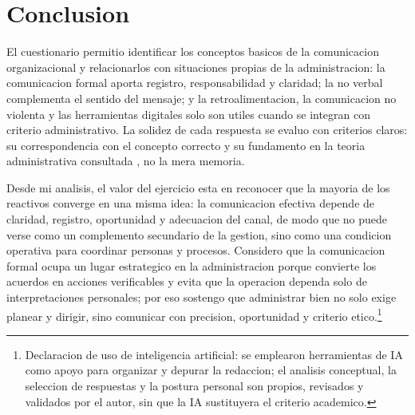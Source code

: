 \documentclass[
	spanish,
	letterpaper, oneside
]{article}
\begin{document}
\clearpage
\section{Conclusion}

El cuestionario permitio identificar los conceptos basicos de la comunicacion organizacional y relacionarlos con situaciones propias de la administracion: la comunicacion formal aporta registro, responsabilidad y claridad; la no verbal complementa el sentido del mensaje; y la retroalimentacion, la comunicacion no violenta y las herramientas digitales solo son utiles cuando se integran con criterio administrativo. La solidez de cada respuesta se evaluo con criterios claros: su correspondencia con el concepto correcto y su fundamento en la teoria administrativa consultada \citep{robbins2017administracion,chiavenato2019introduccion}, no la mera memoria.

Desde mi analisis, el valor del ejercicio esta en reconocer que la mayoria de los reactivos converge en una misma idea: la comunicacion efectiva depende de claridad, registro, oportunidad y adecuacion del canal, de modo que no puede verse como un complemento secundario de la gestion, sino como una condicion operativa para coordinar personas y procesos. Considero que la comunicacion formal ocupa un lugar estrategico en la administracion porque convierte los acuerdos en acciones verificables y evita que la operacion dependa solo de interpretaciones personales; por eso sostengo que administrar bien no solo exige planear y dirigir, sino comunicar con precision, oportunidad y criterio etico.\footnote{Declaracion de uso de inteligencia artificial: se emplearon herramientas de IA como apoyo para organizar y depurar la redaccion; el analisis conceptual, la seleccion de respuestas y la postura personal son propios, revisados y validados por el autor, sin que la IA sustituyera el criterio academico.}


\clearpage


\end{document}
